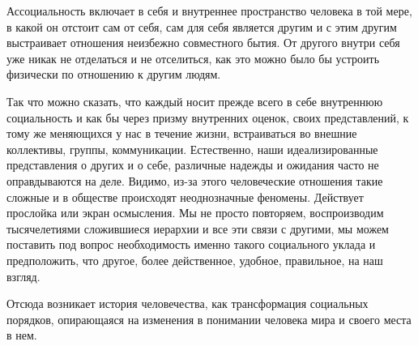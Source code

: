 Ассоциальность включает в себя и внутреннее пространство человека в той мере, в какой он
отстоит сам от себя, сам для себя является другим и с этим другим выстраивает
отношения неизбежно совместного бытия. От другого внутри себя уже никак не
отделаться и не отселиться, как это можно было бы устроить физически по
отношению к другим людям. 


Так что
можно сказать, что каждый носит прежде всего в себе внутреннюю социальность и
как бы через призму внутренних оценок, своих представлений, к тому же меняющихся
у нас в течение жизни, встраиваться во внешние коллективы, группы, коммуникации.
Естественно, наши идеализированные представления о других и о себе, различные
надежды и ожидания часто не оправдываются на деле. Видимо, из-за этого
человеческие отношения такие сложные и в обществе происходят неоднозначные
феномены. Действует прослойка или экран осмысления. Мы не просто повторяем,
воспроизводим тысячелетиями сложившиеся иерархии и все эти связи с другими, мы
можем поставить под вопрос необходимость именно такого социального уклада и
предположить, что другое, более действенное, удобное, правильное, на наш взгляд.

Отсюда возникает история человечества, как трансформация социальных порядков,
опирающаяся на изменения в понимании человека мира и своего места в нем. 


